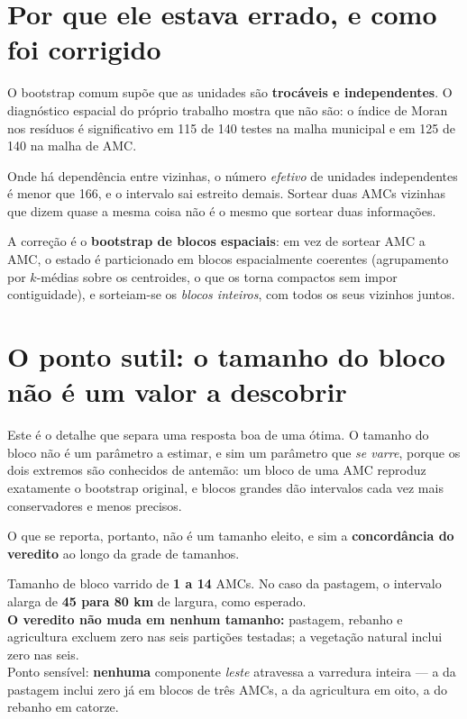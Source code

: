\section{Por que ele estava errado, e como foi corrigido}

O bootstrap comum supõe que as unidades são \textbf{trocáveis e
independentes}. O diagnóstico espacial do próprio trabalho mostra que não são:
o índice de Moran nos resíduos é significativo em 115 de 140 testes na malha
municipal e em 125 de 140 na malha de AMC.

Onde há dependência entre vizinhas, o número \emph{efetivo} de unidades
independentes é menor que 166, e o intervalo sai estreito demais. Sortear duas
AMCs vizinhas que dizem quase a mesma coisa não é o mesmo que sortear duas
informações.

A correção é o \textbf{bootstrap de blocos espaciais}: em vez de sortear AMC a
AMC, o estado é particionado em blocos espacialmente coerentes (agrupamento por
$k$-médias sobre os centroides, o que os torna compactos sem impor
contiguidade), e sorteiam-se os \emph{blocos inteiros}, com todos os seus
vizinhos juntos.

\section{O ponto sutil: o tamanho do bloco não é um valor a descobrir}

Este é o detalhe que separa uma resposta boa de uma ótima. O tamanho do bloco
não é um parâmetro a estimar, e sim um parâmetro que \emph{se varre}, porque
os dois extremos são conhecidos de antemão: um bloco de uma AMC reproduz
exatamente o bootstrap original, e blocos grandes dão intervalos cada vez mais
conservadores e menos precisos.

O que se reporta, portanto, não é um tamanho eleito, e sim a
\textbf{concordância do veredito} ao longo da grade de tamanhos.

\begin{ancora}
Tamanho de bloco varrido de \textbf{1 a 14} AMCs. No caso da pastagem, o
intervalo alarga de \textbf{45 para 80 km} de largura, como esperado. \\
\textbf{O veredito não muda em nenhum tamanho:} pastagem, rebanho e agricultura
excluem zero nas seis partições testadas; a vegetação natural inclui zero nas
seis. \\
Ponto sensível: \textbf{nenhuma} componente \emph{leste} atravessa a varredura
inteira --- a da pastagem inclui zero já em blocos de três AMCs, a da
agricultura em oito, a do rebanho em catorze.
\end{ancora}

